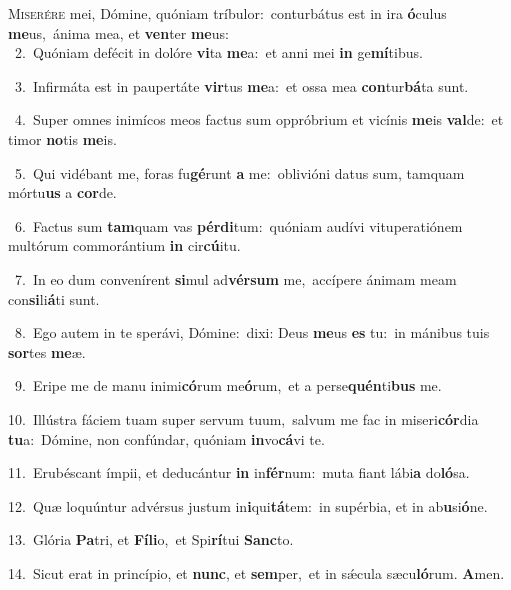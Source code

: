 \lettrine{\initial\textcolor{\initialcolor}{M}}{iserére} mei, Dómine, quóniam tríbulor:~\dagger conturbátus est in ira \textbf{ó}\-culus \textbf{me}\-us,~\star ánima mea, et \textbf{ven}\-ter \textbf{me}\-us:\\
{\numbfont\textcolor{\numbcolor}{~2.}}~Quóniam defécit in dolóre \textbf{vi}\-ta \textbf{me}\-a:~\star et anni mei \textbf{in} ge\-\textbf{mí}\-tibus.\par
{\numbfont\textcolor{\numbcolor}{~3.}}~Infirmáta est in paupertáte \textbf{vir}\-tus \textbf{me}\-a:~\star et ossa mea \textbf{con}\-tur\-\textbf{bá}\-ta sunt.\par
{\numbfont\textcolor{\numbcolor}{~4.}}~Super omnes inimícos meos factus sum oppróbrium et vicínis \textbf{me}\-is \textbf{val}\-de:~\star et timor \textbf{no}\-tis \textbf{me}\-is.\par
{\numbfont\textcolor{\numbcolor}{~5.}}~Qui vidébant me, foras fu\-\textbf{gé}\-runt \textbf{a} me:~\star oblivióni datus sum, tamquam mórtu\textbf{us} a \textbf{cor}\-de.\par
{\numbfont\textcolor{\numbcolor}{~6.}}~Factus sum \textbf{tam}\-quam vas \textbf{pér}\-\textbf{di}tum:~\star quóniam audívi vituperatiónem multórum commorántium \textbf{in} cir\-\textbf{cú}\-itu.\par
{\numbfont\textcolor{\numbcolor}{~7.}}~In eo dum convenírent \textbf{si}\-mul ad\-\textbf{vér}\-\textbf{sum} me,~\star accípere ánimam meam con\-\textbf{si}\-li\-\textbf{á}\-ti sunt.\par
{\numbfont\textcolor{\numbcolor}{~8.}}~Ego autem in te sperávi, Dómine:~\dagger dixi: Deus \textbf{me}\-us \textbf{es} tu:~\star in mánibus tuis \textbf{sor}\-tes \textbf{me}\-æ.\par
{\numbfont\textcolor{\numbcolor}{~9.}}~Eripe me de manu inimi\-\textbf{có}\-rum me\-\textbf{ó}\-rum,~\star et a perse\-\textbf{quén}\-ti\textbf{bus} me.\par
{\numbfont\textcolor{\numbcolor}{10.}}~Illústra fáciem tuam super servum tuum,~\dagger salvum me fac in miseri\-\textbf{cór}\-dia \textbf{tu}\-a:~\star Dómine, non confúndar, quóniam \textbf{in}\-vo\-\textbf{cá}\-vi te.\par
{\numbfont\textcolor{\numbcolor}{11.}}~Erubéscant ímpii, et deducántur \textbf{in} in\-\textbf{fér}\-num:~\star muta fiant lábi\textbf{a} do\-\textbf{ló}\-sa.\par
{\numbfont\textcolor{\numbcolor}{12.}}~Quæ loquúntur advérsus justum in\-\textbf{i}\-qui\-\textbf{tá}\-tem:~\star in supérbia, et in ab\-\textbf{u}\-si\-\textbf{ó}\-ne.\par
{\numbfont\textcolor{\numbcolor}{13.}}~Glória \textbf{Pa}\-tri, et \textbf{Fí}\-\textbf{li}o,~\star et Spi\-\textbf{rí}\-tui \textbf{Sanc}\-to.\par
{\numbfont\textcolor{\numbcolor}{14.}}~Sicut erat in princípio, et \textbf{nunc}\-, et \textbf{sem}\-per,~\star et in sǽcula sæcu\-\textbf{ló}\-rum. \textbf{A}\-men.\par

